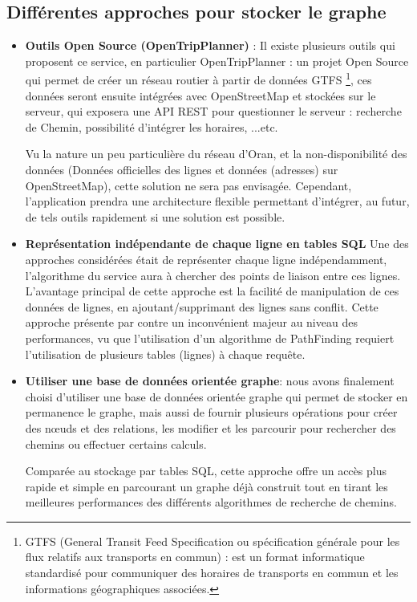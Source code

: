 \subsection{Différentes approches pour stocker le graphe}
\begin{itemize}
	\item \textbf{Outils Open Source (OpenTripPlanner)} : 
	      Il existe plusieurs outils qui proposent ce service, en particulier OpenTripPlanner\cite{OpenTripPlanner} : un projet Open Source qui permet de créer un réseau routier à partir de données GTFS \footnote{GTFS (General Transit Feed Specification ou spécification générale pour les flux relatifs aux transports en commun) : est un format informatique standardisé pour communiquer des horaires de transports en commun et les informations géographiques associées.}, ces données seront ensuite intégrées avec OpenStreetMap et stockées sur le serveur, qui exposera une API REST pour questionner le serveur : recherche de Chemin, possibilité d'intégrer les horaires, ...etc.
	      		
	      Vu la nature un peu particulière du réseau d'Oran, et la non-disponibilité des données (Données officielles des lignes et données (adresses) sur OpenStreetMap), cette solution ne sera pas envisagée. 
	      Cependant, l'application prendra une architecture flexible permettant d'intégrer, au futur, de tels outils rapidement si une solution est possible.
	\item \textbf{Représentation indépendante de chaque ligne en tables \Gls{SQL}}
	      Une des approches considérées était de représenter chaque ligne indépendamment, l'algorithme du service aura à chercher des points de liaison entre ces lignes.
	      L'avantage principal de cette approche est la facilité de manipulation de ces données de lignes, en ajoutant/supprimant des lignes sans conflit.
	      Cette approche présente par contre un inconvénient majeur au niveau des performances, vu que l'utilisation d'un algorithme de PathFinding requiert l'utilisation de plusieurs tables (lignes) à chaque requête.
	      
	\item \textbf{Utiliser une base de données orientée graphe}: nous avons finalement choisi d'utiliser une base de données orientée graphe qui permet de stocker en permanence le graphe, mais aussi de fournir plusieurs opérations pour créer des nœuds et des relations, les modifier et les parcourir pour rechercher des chemins ou effectuer certains calculs.
	
Comparée au stockage par tables SQL, cette approche offre un accès plus rapide et simple en parcourant un graphe déjà construit tout en tirant les meilleures performances des différents algorithmes de recherche de chemins.


\end{itemize}
